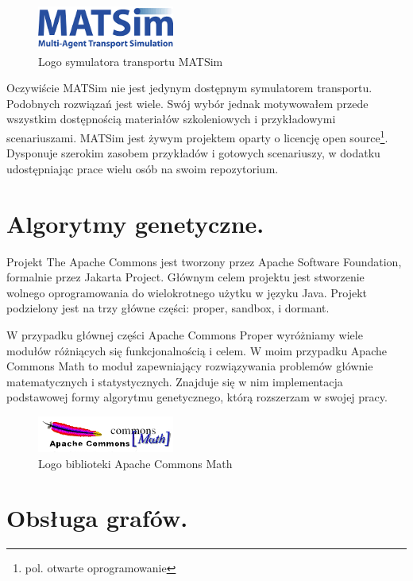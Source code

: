 \documentclass[twoside,12pt]{report}
\begin{document}
\begin{figure}[ht]
\centering
\includegraphics[width=0.40\textwidth]{img/matsim}
\caption{Logo symulatora transportu MATSim} 
\end{figure}

Oczywiście MATSim nie jest jedynym dostępnym symulatorem transportu. Podobnych rozwiązań jest wiele. Swój wybór jednak motywowałem przede wszystkim dostępnością materiałów szkoleniowych i przykładowymi scenariuszami. MATSim jest żywym projektem oparty o licencję open source\footnote{pol. otwarte oprogramowanie}. Dysponuje szerokim zasobem przykładów i gotowych scenariuszy, w dodatku udostępniając prace wielu osób na swoim repozytorium.

\section{Algorytmy genetyczne.}

Projekt The Apache Commons jest tworzony przez Apache Software Foundation, formalnie przez Jakarta Project. Głównym celem projektu jest stworzenie wolnego oprogramowania do wielokrotnego użytku w języku Java. Projekt podzielony jest na trzy główne części: proper, sandbox, i dormant\cite{math}.

W przypadku głównej części Apache Commons Proper wyróżniamy wiele modułów różniących się funkcjonalnością i celem. W moim przypadku Apache Commons Math to moduł zapewniający rozwiązywania problemów głównie matematycznych i statystycznych. Znajduje się w nim implementacja podstawowej formy algorytmu genetycznego, którą rozszerzam w swojej pracy.

\begin{figure}[ht]
\centering
\includegraphics[width=0.40\textwidth]{img/math}
\caption{Logo biblioteki Apache Commons Math} 
\end{figure}

\section{Obsługa grafów.}
\end{document}
